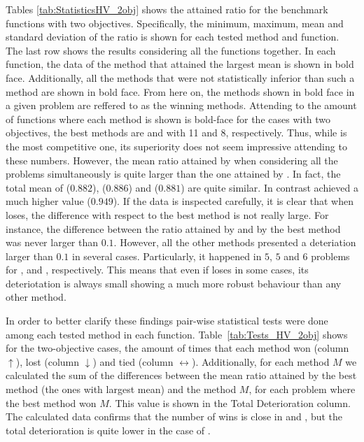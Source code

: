Tables \ref{tab:StatisticsHV_2obj} shows the attained \HV{} ratio for the benchmark functions
with two objectives.
%
Specifically, the minimum, maximum, mean and standard deviation of the \HV{} ratio is shown for each tested method and function.
%
The last row shows the results considering all the functions together.
%
In each function, the data of the method that attained the largest mean is shown in bold face.
%
Additionally, all the methods that were not statistically inferior than such a method are shown in bold face.
%
From here on, the methods shown in bold face in a given problem are reffered to as the winning methods.
%
Attending to the amount of functions where each method is shown is bold-face for the cases 
with two objectives, the best methods are \VSDMOEA{} and \RMOEA{} with 11 and 8, respectively.
%
Thus, while \VSDMOEA{} is the most competitive one, its superiority does not seem impressive
attending to these numbers.
%
However, the mean \HV{} ratio attained by \VSDMOEA{} when considering all the problems simultaneously is quite larger
than the one attained by \RMOEA{}.
%
In fact, the total mean of \RMOEA{} ($0.882$), \NSGAII{} ($0.886$) and \MOEAD{} ($0.881$) are quite similar.
%
In contrast \VSDMOEA{} achieved a much higher value ($0.949$).
%
If the data is inspected carefully, it is clear that when \VSDMOEA{} loses, the difference with respect to the
best method is not really large.
%
For instance, the difference between the \HV{} ratio attained by \VSDMOEA{} and by the best method was never larger
than $0.1$.
%
However, all the other methods presented a deteriation larger than $0.1$ in several cases.
%
Particularly, it happened in $5$, $5$ and $6$ problems for \RMOEA{}, \NSGAII{} and \MOEAD{}, respectively.
%
This means that even if \VSDMOEA{} loses in some cases, its deteriotation is always small showing a much more 
robust behaviour than any other method.




In order to better clarify these findings pair-wise statistical tests were done among each tested method in each
function.
%
Table~\ref{tab:Tests_HV_2obj} shows for the two-objective cases, the amount of times that each method won (column $\uparrow$),
lost (column $\downarrow$) and tied (column $\leftrightarrow$).
%
Additionally, for each method $M$ we calculated the sum of the differences between the mean \HV{} ratio attained by the best method (the ones with largest mean)
and the method $M$, for each problem where the best method won $M$.
%
This value is shown in the Total Deterioration column.
%
The calculated data confirms that the number of wins is close in \VSDMOEA{} and \RMOEA{}, but the total deterioration is quite lower in the case of \VSDMOEA{}.


